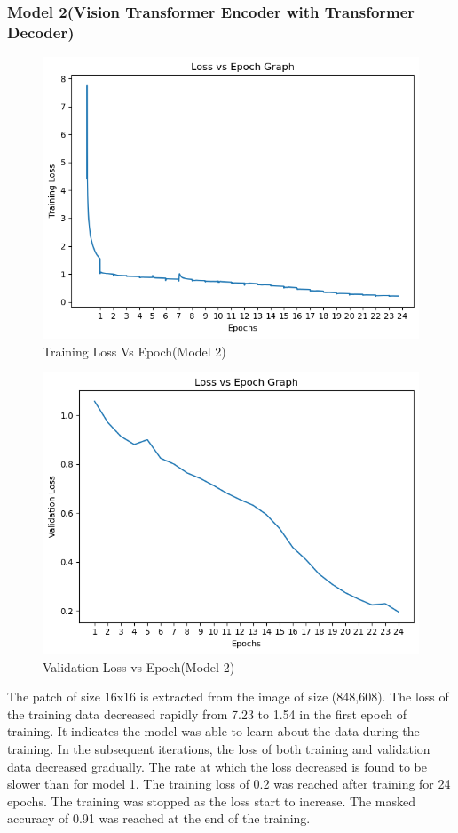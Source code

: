 \subsubsection{Model 2(Vision Transformer Encoder with Transformer Decoder)}
\begin{figure}[H]
    \includegraphics[scale=.8]{images/tl2.png}
    \caption{Training Loss Vs Epoch(Model 2)}
    \label{fig:tl2}
\end{figure}
\begin{figure}[H]
    \includegraphics[scale=.8]{images/vl2.png}
    \caption{Validation Loss vs Epoch(Model 2)}
    \label{fig:vl2}
\end{figure}
The patch of size 16x16 is extracted from the image of size (848,608). The loss of the training data decreased rapidly from 7.23 to 1.54 in the first epoch of training. It indicates the model was able to learn about the data during the training. In the subsequent iterations, the loss of both training and validation data decreased gradually. The rate at which the loss decreased is found to be slower than for model 1. The training loss of 0.2 was reached after training for 24 epochs. The training was stopped as the loss start to increase. The masked accuracy of 0.91 was reached at the end of the training.

